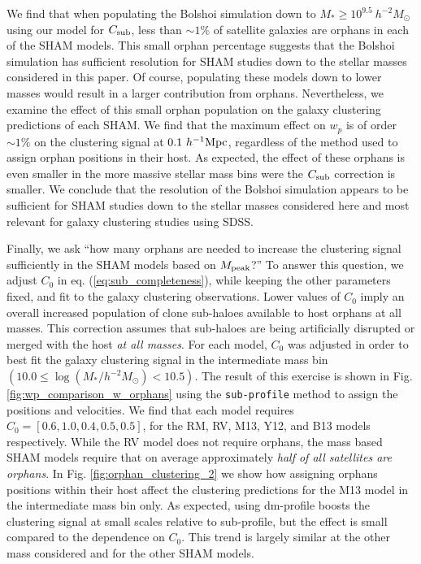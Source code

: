 \documentclass[a4paper,fleqn,usenatbib]{mnras}
\begin{document}
We find that when populating the Bolshoi simulation down to $M_* \geq 10^{9.5}~h^{-2}M_{\odot}$ using our model for $C_{\rm sub}$, less than $\sim 1\%$ of satellite galaxies are orphans in each of the SHAM models.  This small orphan percentage suggests that the Bolshoi simulation has sufficient resolution for SHAM studies down to the stellar masses considered in this paper.  Of course, populating these models down to lower masses would result in a larger contribution from orphans.  Nevertheless, we examine the effect of this small orphan population on the galaxy clustering predictions of each SHAM.  We find that the maximum effect on $w_p$ is of order $\sim 1\%$ on the clustering signal at $0.1~h^{-1}{\rm Mpc}$, regardless of the method used to assign orphan positions in their host.  As expected, the effect of these orphans is even smaller in the more massive stellar mass bins were the $C_{\rm sub}$ correction is smaller.  We conclude that the resolution of the Bolshoi simulation appears to be sufficient for SHAM studies down to the stellar masses considered here and most relevant for galaxy clustering studies using SDSS.     

Finally, we ask ``how many orphans are needed to increase the clustering signal sufficiently in the SHAM models based on $M_{\rm peak}$?''  To answer this question, we adjust $C_0$ in eq. (\ref{eq:sub_completeness}), while keeping the other parameters fixed, and fit to the galaxy clustering observations.  Lower values of $C_0$ imply an overall increased population of clone sub-haloes available to host orphans at all masses.  This correction assumes that sub-haloes are being artificially disrupted or merged with the host {\em at all masses}.  For each model, $C_0$ was adjusted in order to best fit the galaxy clustering signal in the intermediate mass bin $(10.0 \leq \log(M_*/h^{-2}M_{\odot}) <10.5)$.  The result of this exercise is shown in Fig. \ref{fig:wp_comparison_w_orphans} using the {\tt sub-profile} method to assign the positions and velocities.  We find that each model requires $C_{0} = [0.6,1.0, 0.4, 0.5, 0.5]$, for the RM, RV, M13, Y12, and B13 models respectively.  While the RV model does not require orphans, the mass based SHAM models require that on average approximately {\em half of all satellites are orphans}.  In Fig. \ref{fig:orphan_clustering_2} we show how assigning orphans positions within their host affect the clustering predictions for the M13 model in the intermediate mass bin only.  As expected, using {\rm dm-profile} boosts the clustering signal at small scales relative to {\rm sub-profile}, but the effect is small compared to the dependence on $C_{0}$.  This trend is largely similar at the other mass considered and for the other SHAM models.
\end{document}
